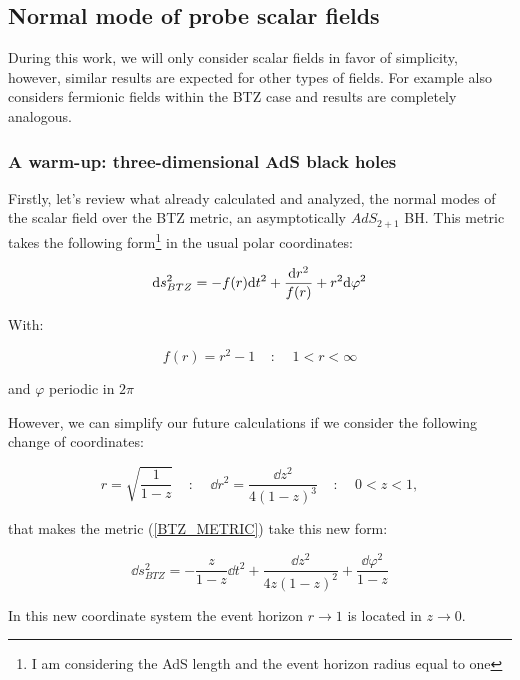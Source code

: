 \documentclass[11pt,a4paper]{article}
\begin{document}
\subsection{Normal mode of probe scalar fields}

During this work, we will only consider scalar fields in favor of simplicity, however, similar results are expected for other types of fields. For example \cite{Jeong_2025} also considers fermionic fields within the BTZ case and results are completely analogous.

\subsubsection{A warm-up: three-dimensional AdS black holes}

Firstly, let's review what \cite{Jeong_2025,Das_2023,das2023fuzzballsrandommatrices} already calculated and analyzed, the normal modes of the scalar field over the BTZ metric, an asymptotically $AdS_{2+1}$ BH. This metric takes the following form\footnote{I am considering the AdS length and the event horizon radius equal to one} in the usual polar coordinates:

\begin{equation}\LA{BTZ_METRIC}
    \dd s^2_{BTZ} = -f(r)\dd t^2 + \frac{\dd r^2}{f(r)} + r^2 \dd\varphi^2
\end{equation}

{\noindent With:}

\begin{equation}
    f(r) = r^2 - 1 ~~~~~:~~~~~ 1 < r < \infty
\end{equation}

{\noindent and $\varphi$ periodic in $2\pi$}

However, we can simplify our future calculations if we consider the following change of coordinates:

\begin{equation}
    r = \sqrt{\frac{1}{1-z}} ~~~~~:~~~~~ \dd r^2 = \frac{\dd z^2}{4(1-z)^3} ~~~~~:~~~~~ 0 < z < 1,
\end{equation}

{\noindent that makes the metric (\ref{BTZ_METRIC}) take this new form:}

\begin{equation}
    \dd s^2_{BTZ} = -\frac{z}{1-z}\dd t^2 + \frac{\dd z^2 }{4z(1-z)^2} + \frac{\dd\varphi^2}{1-z}
\end{equation}

{\noindent In this new coordinate system the event horizon $r\rightarrow 1$ is located in $z\rightarrow 0$.}
\end{document}
